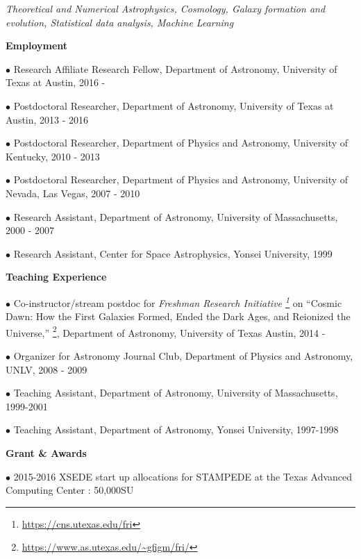 \documentclass [11pt]{article}
\begin{document}
{\vspace{.05in}
\noindent \emph{Theoretical and Numerical Astrophysics, Cosmology, Galaxy formation and evolution, Statistical data analysis, Machine Learning}


\vspace{.2in}
\noindent \textbf{Employment}

\vspace{.02in}
\noindent
$\bullet$ Research Affiliate Research Fellow, Department of Astronomy, University of Texas at Austin, 2016 -

\noindent
$\bullet$ Postdoctoral Researcher, Department of Astronomy, University of Texas at Austin, 2013 - 2016

\noindent
$\bullet$ Postdoctoral Researcher, Department of Physics and Astronomy, University of Kentucky, 2010 - 2013

\noindent
$\bullet$ Postdoctoral Researcher, Department of Physics and Astronomy, University of Nevada, Las Vegas, 2007 - 2010

\noindent
$\bullet$ Research Assistant, Department of Astronomy, University of Massachusetts, 2000 - 2007

\noindent
$\bullet$ Research Assistant, Center for Space Astrophysics, Yonsei University, 1999


\vspace{.2in}
\noindent \textbf{Teaching Experience}

\vspace{.02in}
\noindent
$\bullet$ Co-instructor/stream postdoc for {\it Freshman Research Initiative \footnote{ \url{https://cns.utexas.edu/fri}}} on ``Cosmic Dawn: How the First Galaxies Formed, Ended the Dark Ages, and Reionized the Universe,'' \footnote{\url{https://www.as.utexas.edu/~gfigm/fri/}}, Department of Astronomy, University of Texas Austin, 2014 - 

\noindent
$\bullet$ Organizer for Astronomy Journal Club, Department of Physics and Astronomy, UNLV, 2008 - 2009

\noindent
$\bullet$ Teaching Assistant, Department of Astronomy, University of Massachusetts, 1999-2001

\noindent
$\bullet$ Teaching Assistant, Department of Astronomy, Yonsei University, 1997-1998

\vspace{.2in}
\noindent \textbf{Grant \& Awards}

\vspace{.02in}
\noindent
$\bullet$ 2015-2016 XSEDE start up allocations for STAMPEDE at the Texas Advanced Computing Center : 50,000SU

}
\end{document}
